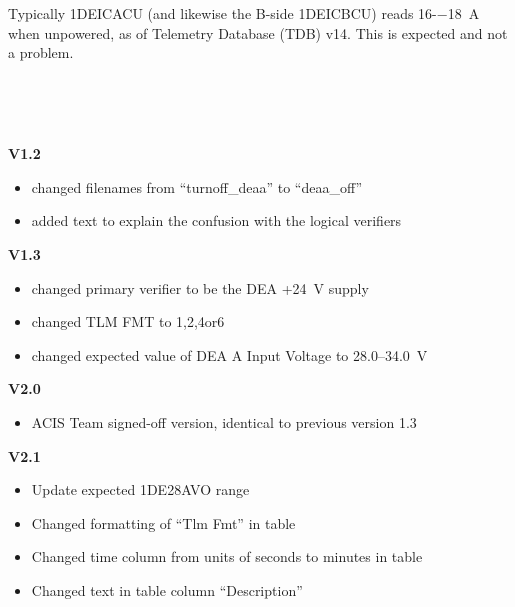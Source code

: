 \documentclass[11pt]{article}
\begin{document}
\normalsize
{} \\
\normalsize


\normalsize
{} \\
\normalsize

Typically 1DEICACU (and likewise the B-side 1DEICBCU) reads 16-−18~A when unpowered, as of Telemetry Database (TDB) v14. This is expected and not a problem.

\vspace{0.15in}
\normalsize
{} \\
\normalsize

\normalsize
{} \\
\normalsize

{\bf V1.2}
\begin{itemize}
\item changed filenames from ``turnoff\_deaa'' to
``deaa\_off''
\item added text to explain the confusion with the logical verifiers
\end{itemize}

{\bf V1.3}
\begin{itemize}
\item changed primary verifier to be the DEA +24~V supply
\item changed TLM FMT to 1,2,4or6
\item changed expected value of DEA A Input Voltage to 28.0--34.0~V
\end{itemize}

{\bf V2.0}
\begin{itemize}
\item ACIS Team signed-off version, identical to previous version 1.3
\end{itemize}

{\bf V2.1}
\begin{itemize}
\item Update expected 1DE28AVO range
\item Changed formatting of ``Tlm Fmt'' in table
\item Changed time column from units of seconds to minutes in table
\item Changed text in table column ``Description''
\end{itemize}
\end{document}
